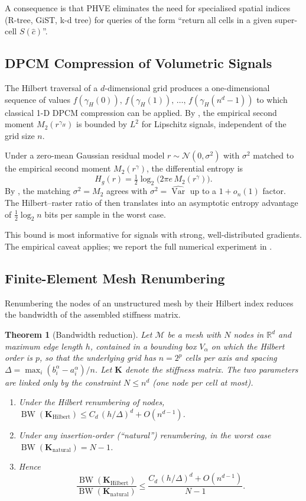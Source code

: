 \documentclass[11pt,a4paper]{article}
\theoremstyle{plain}
\newtheorem{theorem}{Theorem}[section]
\theoremstyle{definition}
\theoremstyle{remark}
\newcommand{\R}{\mathbb{R}}
\DeclareMathOperator{\BW}{BW}
\DeclareMathOperator{\Var}{Var}
\begin{document}
A consequence is that PHVE eliminates the need for specialised spatial
indices (R-tree, GiST, k-d tree) for queries of the form ``return all
cells in a given super-cell $S(\hat c)$''.

\subsection{DPCM Compression of Volumetric Signals}\label{sec:app_dpcm}

The Hilbert traversal of a $d$-dimensional grid produces a one-dimensional
sequence of values
$f(\gamma_H(0)),\,f(\gamma_H(1)),\,\dots,\,f(\gamma_H(n^d-1))$ to which
classical 1-D DPCM compression can be applied. By , the
empirical second moment $M_2(r^{\gamma_H})$ is bounded by $L^2$ for
Lipschitz signals, independent of the grid size $n$.

Under a zero-mean Gaussian residual model $r\sim\mathcal{N}(0,\sigma^2)$
with $\sigma^2$ matched to the empirical second moment $M_2(r^\gamma)$,
the differential entropy is
\[
H_g(r) = \tfrac12 \log_2\bigl(2\pi e\,M_2(r^\gamma)\bigr).
\]
By , the matching $\sigma^2 = M_2$ agrees with
$\sigma^2 = \widehat{\Var}$ up to a $1+o_n(1)$ factor. The
Hilbert--raster ratio of  then translates into an
asymptotic entropy advantage of $\tfrac{1}{2}\log_2 n$ bits per sample
in the worst case.

This bound is most informative for signals with strong, well-distributed
gradients. The empirical caveat  applies; we report
the full numerical experiment in .

\subsection{Finite-Element Mesh Renumbering}\label{sec:app_fem}

Renumbering the nodes of an unstructured mesh by their Hilbert index
reduces the bandwidth of the assembled stiffness matrix.

\begin{theorem}[Bandwidth reduction]\label{thm:bandwidth}
Let $\mathcal{M}$ be a mesh with $N$ nodes in $\R^d$ and maximum edge
length $h$, contained in a bounding box $V_\alpha$ on which the Hilbert
order is $p$, so that the underlying grid has $n=2^p$ cells per axis and
spacing $\Delta = \max_i (b_i^\alpha-a_i^\alpha)/n$. Let $\mathbf{K}$
denote the stiffness matrix. The two parameters are linked only by the
constraint $N \leq n^d$ (one node per cell at most).
\begin{enumerate}[label=(\alph*),nosep]
\item Under the Hilbert renumbering of nodes,
$\BW(\mathbf{K}_{\mathrm{Hilbert}}) \leq C_d\,(h/\Delta)^d + O(n^{d-1})$.
\item Under any insertion-order (``natural'') renumbering, in the
worst case $\BW(\mathbf{K}_{\mathrm{natural}}) = N-1$.
\item Hence
\[
\frac{\BW(\mathbf{K}_{\mathrm{Hilbert}})}
     {\BW(\mathbf{K}_{\mathrm{natural}})}
\leq \frac{C_d\,(h/\Delta)^d + O(n^{d-1})}{N-1}.
\]
\end{enumerate}
\end{theorem}
\end{document}
